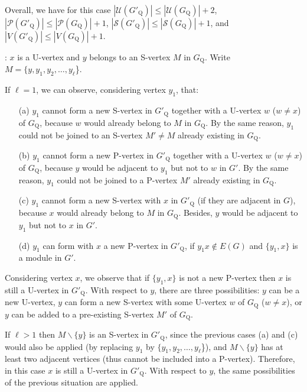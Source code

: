 \documentclass[12pt]{article}
\begin{document}
Overall,  we have for this case
$|{\mathcal U}(G'_{\mathrm Q})| \leq |{\mathcal U}(G_{\mathrm Q})| + 2$,
$|{\mathcal P}(G'_{\mathrm Q})| \leq |{\mathcal P}(G_{\mathrm Q})|+1$,
$|{\mathcal S}(G'_{\mathrm Q})| \leq |{\mathcal S}(G_{\mathrm Q})|+1$, and
$|V(G'_{\mathrm Q})| \leq |V(G_{\mathrm Q})| + 1$.

\medskip


: $x$ is a U-vertex and $y$ belongs to an
S-vertex $M$ in $G_{\mathrm Q}$. Write $M=\{y,y_1, y_2, \ldots, y_{\ell}$\}.

If $\ell=1$, we can observe, considering vertex $y_1$, that:
\begin{itemize}
\item[(a)] $y_1$ cannot form a new S-vertex in $G'_{\mathrm Q}$ together with a U-vertex $w$ ($w\not= x$) of $G_{\mathrm Q}$, because $w$ would already belong to $M$ in $G_{\mathrm Q}$. By the same reason, $y_1$ could not be joined to an S-vertex $M' \not= M$ already existing in $G_{\mathrm Q}$.

\item[(b)] $y_1$ cannot form a new P-vertex in $G'_{\mathrm Q}$ together with a U-vertex $w$ ($w\not= x$) of $G_{\mathrm Q}$, because $y$ would be adjacent to $y_1$ but not to $w$ in $G'$. By the same reason, $y_1$ could not be joined to a P-vertex $M'$ already existing in $G_{\mathrm Q}$.

\item[(c)] $y_1$ cannot form a new S-vertex with $x$ in $G'_{\mathrm Q}$ (if they are adjacent in $G$), because $x$ would already belong to $M$ in $G_{\mathrm Q}$. Besides, $y$ would be adjacent to $y_1$ but not to $x$ in $G'$.

\item[(d)] $y_1$ can form with $x$ a new P-vertex in $G'_{\mathrm Q}$, if $y_1x \notin E(G)$ and $\{y_1,x\}$ is a module in $G'$.
\end{itemize}

Considering vertex $x$, we observe that if $\{y_1, x\}$ is not a new P-vertex then $x$ is still a U-vertex in $G'_{\mathrm Q}$.
With respect to $y$, there are three possibilities: $y$ can be a new U-vertex, $y$ can form a new S-vertex with some U-vertex $w$ of $G_{\mathrm Q}$ ($w \not=x$), or $y$ can be added to a pre-existing S-vertex $M'$ of $G_{\mathrm Q}$.


If $\ell>1$ then $M \backslash \{y\}$ is an S-vertex in $G'_{\mathrm Q}$, since the previous cases (a) and (c) would also be applied (by replacing $y_1$ by $\{y_1, y_2, \ldots, y_{\ell}$\}), and $M \backslash \{y\}$ has at least two adjacent vertices (thus cannot be included into a P-vertex). Therefore, in this case $x$ is still a U-vertex in $G'_{\mathrm Q}$. With respect to $y$, the same possibilities  of the previous situation are applied.
\end{document}
